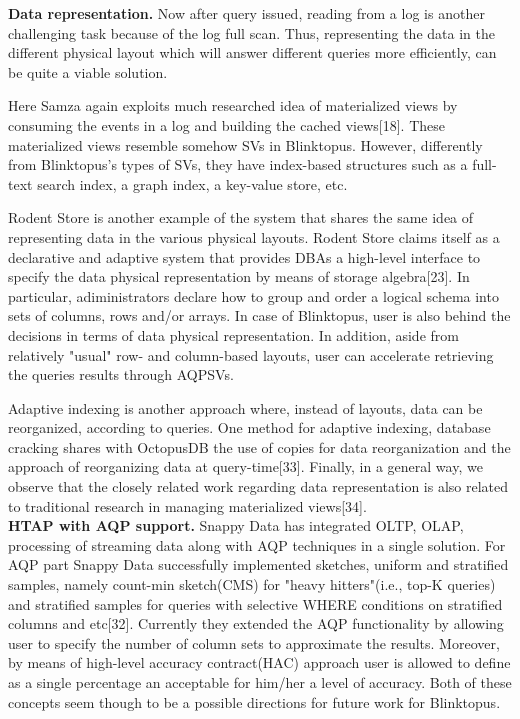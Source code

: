 \documentclass[10pt, conference, compsocconf]{IEEEtran}
\begin{document}
\textbf{Data representation.} Now after query issued, reading from a log is another challenging task because of the log full scan. Thus, representing the data in the different physical layout which will  answer different queries more efficiently, can be quite a viable solution. 

Here Samza again exploits much researched idea of materialized views by consuming the events in a log and building the cached views[18]. These materialized views resemble somehow SVs in Blinktopus. However, differently from Blinktopus's types of SVs, they have index-based structures such as a full-text search index, a graph index, a key-value store, etc. 

Rodent Store is another example of the system that shares the same idea of representing data in the various physical layouts. Rodent Store claims itself as a declarative and adaptive system that provides DBAs a high-level interface to specify the data physical representation by means of storage algebra[23]. In particular, adiministrators declare how to group and order a logical schema into sets of columns, rows and/or arrays. In case of Blinktopus, user is also behind the decisions in terms of data physical representation. In addition, aside from relatively "usual" row- and column-based layouts, user can accelerate retrieving the queries results through AQPSVs. 

Adaptive indexing is another approach where, instead of layouts, data can be reorganized, according to queries. One method for adaptive indexing, database cracking shares with OctopusDB the use of copies for data reorganization and the approach of reorganizing data at query-time[33]. Finally, in a general way,  we observe that the closely related work regarding data representation is also related to traditional research in managing materialized views[34]. \\
\textbf{HTAP with AQP support.} %
Snappy Data has integrated OLTP, OLAP, processing of streaming data along with  AQP techniques in a single solution. For AQP part Snappy Data successfully implemented sketches, uniform and stratified samples, namely count-min sketch(CMS) for "heavy hitters"(i.e., top-K queries) and stratified samples for queries with selective WHERE conditions on stratified columns and etc[32]. Currently they extended the AQP functionality by allowing user to specify the number of column sets to approximate the results. Moreover, by means of high-level accuracy contract(HAC) approach user is allowed to define as a single percentage an acceptable for him/her a level of accuracy. Both of these concepts seem though to be a possible directions for future work for Blinktopus.
\end{document}

